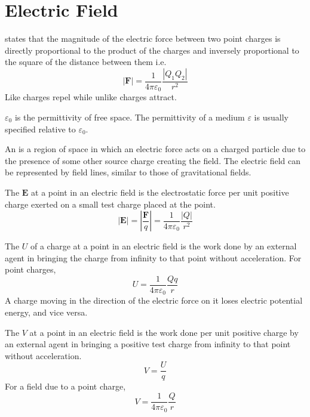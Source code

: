 \documentclass[Physics.tex]{subfiles}
\begin{document}
\chapter{Electric Field}
 states that the magnitude of the electric force between two point charges is directly proportional to the product of the charges and inversely proportional to the square of the distance between them i.e. \begin{equation}\left|\mathbf{F}\right| = \frac{1}{4\pi\varepsilon_{0}}\frac{\left|Q_{1}Q_{2}\right|}{r^{2}}\end{equation} Like charges repel while unlike charges attract.

\(\varepsilon_{0}\) is the permittivity of free space. The permittivity of a medium \(\varepsilon\) is usually specified relative to \(\varepsilon_{0}\).

An  is a region of space in which an electric force acts on a charged particle due to the presence of some other source charge creating the field. The electric field can be represented by field lines, similar to those of gravitational fields.

The  \(\mathbf{E}\) at a point in an electric field is the electrostatic force per unit positive charge exerted on a small test charge placed at the point. \begin{equation}\left|\mathbf{E}\right| = \left|\frac{\mathbf{F}}{q}\right| = \frac{1}{4\pi\varepsilon_{0}}\frac{\left|Q\right|}{r^{2}}\end{equation}

The  \(U\) of a charge at a point in an electric field is the work done by an external agent in bringing the charge from infinity to that point without acceleration. For point charges, \begin{equation}U = \frac{1}{4\pi\varepsilon_{0}}\frac{Qq}{r}\end{equation} A charge moving in the direction of the electric force on it loses electric potential energy, and vice versa.

The  \(V\) at a point in an electric field is the work done per unit positive charge by an external agent in bringing a positive test charge from infinity to that point without acceleration. \begin{equation}V = \frac{U}{q}\end{equation} For a field due to a point charge, \begin{equation}V = \frac{1}{4\pi\varepsilon_{0}}\frac{Q}{r}\end{equation}
\end{document}
